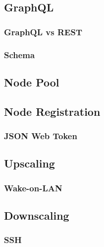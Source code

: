 \subsection{GraphQL}
\label{subsec:implementation_server_graphql}

\subsubsection{GraphQL vs REST}
\label{subsubsec:implementation_server_graphql_graphql_vs_rest}

\subsubsection{Schema}
\label{subsubsec:implementation_server_graphql_schema}

\subsection{Node Pool}
\label{subsec:implementation_server_node_pool}

\subsection{Node Registration}
\label{subsec:implementation_server_node_registration}

\subsubsection{JSON Web Token}
\label{subsubsec:implementation_server_node_registration_json_web_token}

\subsection{Upscaling}
\label{subsec:implementation_server_upscaling}

\subsubsection{Wake-on-LAN}
\label{subsubsec:implementation_server_scale_up_wake_on_lan}

\subsection{Downscaling}
\label{subsec:implementation_server_downscaling}

\subsubsection{SSH}
\label{subsubsec:implementation_server_scale_up_ssh}

